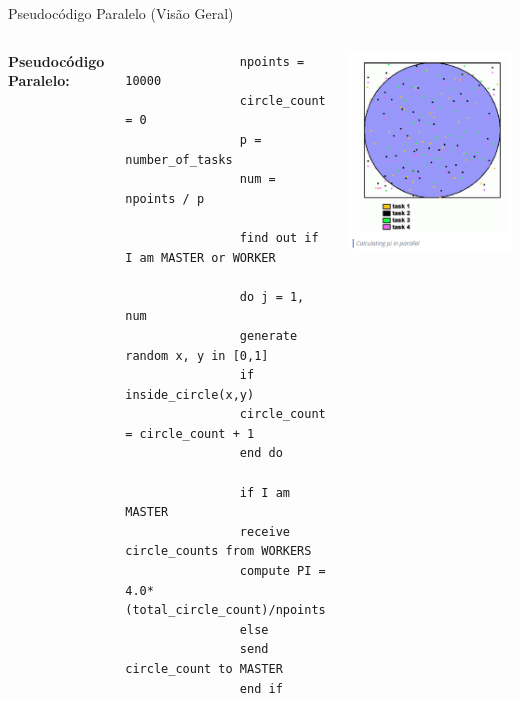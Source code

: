 \documentclass{beamer}
\begin{document}
	\begin{frame}[fragile]{Pseudocódigo Paralelo (Visão Geral)}
		
		\begin{columns}[T]
			\scriptsize
			\textbf{Pseudocódigo Paralelo:}
			\begin{verbatim}
				npoints = 10000
				circle_count = 0
				p = number_of_tasks
				num = npoints / p
				
				find out if I am MASTER or WORKER
				
				do j = 1, num
				generate random x, y in [0,1]
				if inside_circle(x,y)
				circle_count = circle_count + 1
				end do
				
				if I am MASTER
				receive circle_counts from WORKERS
				compute PI = 4.0*(total_circle_count)/npoints
				else
				send circle_count to MASTER
				end if
			\end{verbatim}
			
			\includegraphics[scale=0.4]{par_circfig.png}
		\end{columns}
	\end{frame}
	
\end{document}
